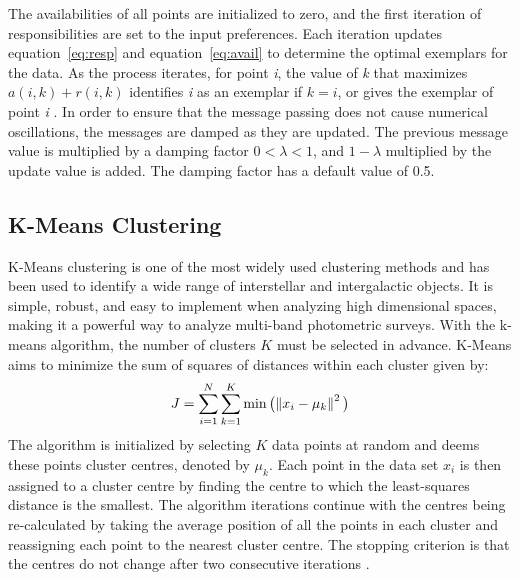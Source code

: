 The availabilities of all points are initialized to zero, and the first iteration of responsibilities are set to the input preferences.
Each iteration updates equation~\ref{eq:resp} and equation~\ref{eq:avail} to determine the optimal exemplars for the data.
As the process iterates, for point \textit{i}, the value of \textit{k} that maximizes $a(i,k) + r(i,k)$ identifies \textit{i} as an exemplar if $k=i$, or gives the exemplar of point \textit{i} \citet{frey07}.
In order to ensure that the message passing does not cause numerical oscillations, the messages are damped as they are updated.
The previous message value is multiplied by a damping factor $0 <\lambda<1$, and $1 - \lambda$ multiplied by the update value is added. %
The damping factor has a default value of 0.5. %


\subsection{K-Means Clustering}
K-Means clustering is one of the most widely used clustering methods and has been used to identify a wide range of interstellar and intergalactic objects. %
It is simple, robust, and easy to implement when analyzing high dimensional spaces, making it a powerful way to analyze multi-band photometric surveys. 
With the k-means algorithm, the number of clusters $K$ must be selected in advance.
K-Means aims to minimize the sum of squares of distances within each cluster given by:
\begin{equation}
\label{eq:km_sos}
J = \sum_{i=1}^N \sum_{k=1}^K \min \big( \norm{x_i - \mu_k}^2 \big)
\end{equation}
The algorithm is initialized by selecting $K$ data points at random and deems these points cluster centres, denoted by $\mu_k$. 
Each point in the data set $x_i$ is then assigned to a cluster centre by finding the centre to which the least-squares distance is the smallest.
The algorithm iterations continue with the centres being re-calculated by taking the average position of all the points in each cluster and reassigning each point to the nearest cluster centre.
The stopping criterion is that the centres do not change after two consecutive iterations \citep{sanchez-almeida13}. %

